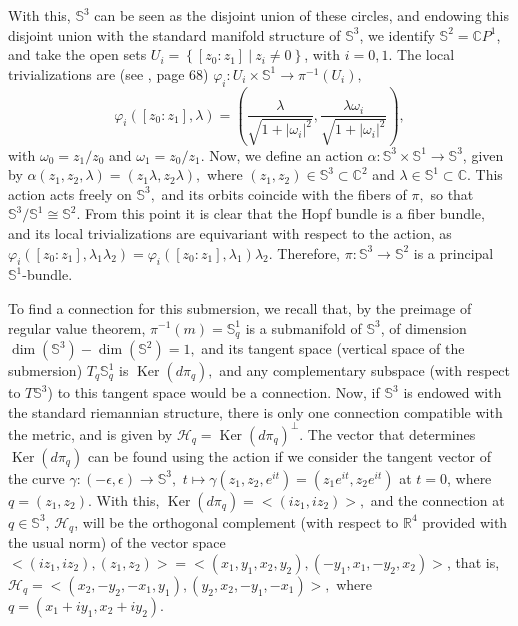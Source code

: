 \documentclass[12pt, letterpaper, reqno]{amsart}
\theoremstyle{definition}
\theoremstyle{plain}
\theoremstyle{remark}
\begin{document}
	With this, $ \mathbb{S}^3 $ can be seen as the disjoint union of these circles, and endowing this disjoint union with the standard manifold structure of $ \mathbb{S}^3 $, we identify $ \mathbb{S}^2 = \mathbb{C}P^1$, and take the open sets $ U_i= \left\{ \left[ z_0 : z_1 \right]\ | \ z_i\neq 0 \right\}$, with $ i=0,1. $ The local trivializations are (see \cite{luke2013vector}, page 68) $ \varphi_i: U_i \times \mathbb{S}^1 \rightarrow \pi^{-1}(U_i), $ $$ \varphi_i([z_0:z_1], \lambda) = \left( \frac{\lambda}{\sqrt{1+|\omega_i|^2}}, \frac{\lambda\omega_i}{\sqrt{1+|\omega_i|^2}}   \right), $$ with $ \omega_0=z_1/z_0 $ and $ \omega_1 = z_0/z_1. $ Now, we define an action $ \alpha: \mathbb{S}^3\times \mathbb{S}^1 \rightarrow { \mathbb{S}^3}
	$, given by $ \alpha(z_1,z_2,\lambda) = (z_1\lambda, z_2\lambda), $ where $ (z_1,z_2)\in \mathbb{S}^3\subset \mathbb{C}^2 $ and $ \lambda\in \mathbb{S}^1 \subset \mathbb{C}. $ This action acts freely on $ \mathbb{S}^3, $ and its orbits coincide with the fibers of $ \pi, $ so that $ \mathbb{S}^3/ \mathbb{S}^1 \cong \mathbb{S}^2. $ From this point it is clear that the Hopf bundle is a fiber bundle, and its local trivializations are equivariant with respect to the action, as $ \varphi_i([z_0:z_1], \lambda_1\lambda_2) = \varphi_i([z_0:z_1], \lambda_1)\lambda_2. $ Therefore, $ \pi: \mathbb{S}^3 \rightarrow { \mathbb{S}^2} $ is a principal $ \mathbb{S}^1$-bundle.

	To find a connection for this submersion, we recall that, by the preimage of regular value theorem, $ \pi^{-1}(m) = \mathbb{S}^1_q $ is a submanifold of $ \mathbb{S}^3 $, of dimension $ \operatorname{dim}( \mathbb{S}^3)- \operatorname{dim}( \mathbb{S}^2) = 1,  $ and its tangent space (vertical space of the submersion) $ T_q \mathbb{S}^1_q $ is $ \operatorname{Ker}(d\pi_q),  $ and any complementary subspace (with respect to $ T \mathbb{S}^3 $)  to this tangent space would be a connection. Now, if $ \mathbb{S}^3 $ is endowed with the standard riemannian structure, there is only one connection compatible with the metric, and is given by $ \mathcal{H}_q = \operatorname{Ker}(d\pi_q)^\perp. $ The vector that determines $ \operatorname{Ker}(d\pi_q)  $ can be found using the action if we consider the tangent vector of the curve $ \gamma: (-\epsilon, \epsilon) \rightarrow \mathbb{S}^3, $ $ t\mapsto \gamma(z_1,z_2, e^{it})=(z_1e^{it},z_2e^{it}) $ at $ t=0 $, where $ q=(z_1,z_2). $ With this, $ \operatorname{Ker}(d\pi_q) = <(iz_1, iz_2)>,  $ and the connection at $ q\in \mathbb{S}^3 $,  $ \mathcal{H}_q $, will be the orthogonal complement (with respect to $ \mathbb{R}^4 $ provided with the usual norm) of the vector space $ <(iz_1,iz_2), (z_1,z_2)>  {= <(x_1,y_1,x_2,y_2), (-y_1,x_1,-y_2,x_2)>}$, that is, $ \mathcal{H}_q = <(x_2,-y_2,-x_1,y_1),(y_2,x_2,-y_1,-x_1)>, $ where $ q=(x_1+iy_1, x_2+iy_2). $   
\end{document}
